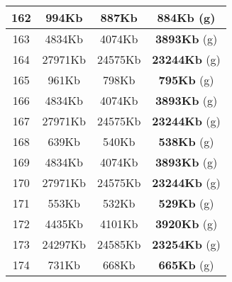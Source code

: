 \begin{table}[H]
\begin{minipage}{5cm}
{\begin{tabular}{|c|c|c|c|}
\hline
162 & 994Kb & 887Kb & \textbf{884Kb} (g) \\
\hline
163 & 4834Kb & 4074Kb & \textbf{3893Kb} (g) \\
\hline
164 & 27971Kb & 24575Kb & \textbf{23244Kb} (g) \\
\hline
165 & 961Kb & 798Kb & \textbf{795Kb} (g) \\
\hline
166 & 4834Kb & 4074Kb & \textbf{3893Kb} (g) \\
\hline
167 & 27971Kb & 24575Kb & \textbf{23244Kb} (g) \\
\hline
168 & 639Kb & 540Kb & \textbf{538Kb} (g) \\
\hline
169 & 4834Kb & 4074Kb & \textbf{3893Kb} (g) \\
\hline
170 & 27971Kb & 24575Kb & \textbf{23244Kb} (g) \\
\hline
171 & 553Kb & 532Kb & \textbf{529Kb} (g) \\
\hline
172 & 4435Kb & 4101Kb & \textbf{3920Kb} (g) \\
\hline
173 & 24297Kb & 24585Kb & \textbf{23254Kb} (g) \\
\hline
174 & 731Kb & 668Kb & \textbf{665Kb} (g) \\
\hline
\end{tabular}
}
\end{minipage}
\begin{minipage}{5cm} 
\end{minipage}
\end{table}
